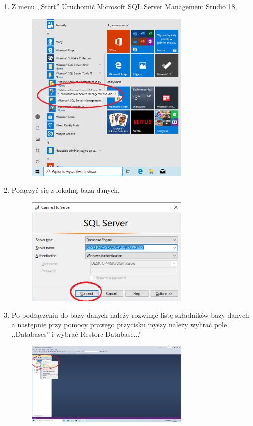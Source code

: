\documentclass[12pt,a4paper]{article}
\begin{document}
\begin{enumerate}
				\item Z menu ,,Start'' Uruchomić Microsoft SQL Server Management Studio 18,
					\begin{figure}[H]
						\centering
						\includegraphics[width=8cm]{img/Local_Install_8.eps}
					\end{figure}
							
				\item Połączyć się z lokalną bazą danych,~
					\begin{figure}[H]
						\centering
						\includegraphics[width=8cm]{img/Local_Install_9.eps}
					\end{figure}
						
				\item Po podłączeniu do bazy danych należy rozwinąć listę składników bazy danych a następnie przy pomocy prawego przycisku myszy należy wybrać pole ,,Databases'' i wybrać
					Restore Database...''
					\begin{figure}[H]
						\centering
						\includegraphics[width=8cm]{img/Local_Install_10.eps}
					\end{figure}
									 					

\end{enumerate}
\end{document}
